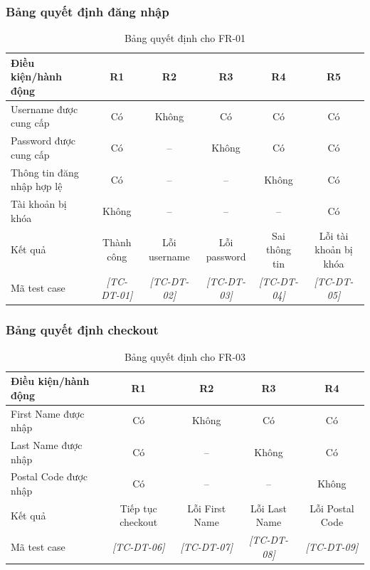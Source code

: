 \documentclass[a4paper,12pt]{article}
\newcommand{\fillin}[1]{\textit{[#1]}}
\begin{document}
\subsubsection{Bảng quyết định đăng nhập}
\begin{table}[htbp]
\centering
\caption{Bảng quyết định cho FR-01}
\small
\begin{tabularx}{\textwidth}{|X|c|c|c|c|c|}
\hline
\textbf{Điều kiện/hành động} & \textbf{R1} & \textbf{R2} & \textbf{R3} & \textbf{R4} & \textbf{R5} \\
\hline
Username được cung cấp & Có & Không & Có & Có & Có \\
\hline
Password được cung cấp & Có & -- & Không & Có & Có \\
\hline
Thông tin đăng nhập hợp lệ & Có & -- & -- & Không & Có \\
\hline
Tài khoản bị khóa & Không & -- & -- & -- & Có \\
\hline
Kết quả & Thành công & Lỗi username & Lỗi password & Sai thông tin & Lỗi tài khoản bị khóa \\
\hline
Mã test case & \fillin{TC-DT-01} & \fillin{TC-DT-02} & \fillin{TC-DT-03} & \fillin{TC-DT-04} & \fillin{TC-DT-05} \\
\hline
\end{tabularx}
\end{table}

\subsubsection{Bảng quyết định checkout}
\begin{table}[htbp]
\centering
\caption{Bảng quyết định cho FR-03}
\small
\begin{tabularx}{\textwidth}{|X|c|c|c|c|}
\hline
\textbf{Điều kiện/hành động} & \textbf{R1} & \textbf{R2} & \textbf{R3} & \textbf{R4} \\
\hline
First Name được nhập & Có & Không & Có & Có \\
\hline
Last Name được nhập & Có & -- & Không & Có \\
\hline
Postal Code được nhập & Có & -- & -- & Không \\
\hline
Kết quả & Tiếp tục checkout & Lỗi First Name & Lỗi Last Name & Lỗi Postal Code \\
\hline
Mã test case & \fillin{TC-DT-06} & \fillin{TC-DT-07} & \fillin{TC-DT-08} & \fillin{TC-DT-09} \\
\hline
\end{tabularx}
\end{table}
\end{document}
